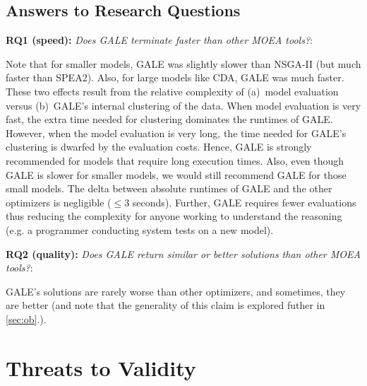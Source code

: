 \documentclass[10pt,journal,compsoc]{IEEEtran}
\newcommand{\tion}[1]{\textsection\ref{sec:#1}}
\begin{document}
\subsection{Answers to Research Questions}

{\bf RQ1 (speed):} {\em Does GALE terminate faster than other MOEA tools?}:

Note that 
for  smaller models, GALE was slightly slower than NSGA-II (but much faster than 
SPEA2). Also, for large models like CDA, GALE was much faster.
These two effects result from the relative complexity
of (a)~model evaluation versus (b)~GALE's internal clustering of the data.
When model evaluation is very fast, the extra time needed for clustering
dominates the runtimes of GALE.  However, when the
model evaluation is very long, the time
needed for GALE's clustering is dwarfed by the evaluation costs. Hence,
GALE is strongly recommended for models that require long execution times.
Also, even though GALE is slower for smaller models, we would still recommend GALE 
for those small models.
The delta between absolute runtimes of GALE and the other optimizers is negligible 
($\le 3$ seconds).
Further, GALE requires fewer evaluations thus reducing the complexity
for anyone working to understand the reasoning (e.g.  a
programmer conducting system tests on a new model).

{\bf RQ2 (quality):} {\em Does  GALE  return  similar or better solutions than other MOEA tools?}:

GALE's solutions are rarely worse than other optimizers, and sometimes, they are 
better (and note that the generality of this claim is explored futher in \tion{ob}.).


\section{Threats to Validity}
\end{document}
